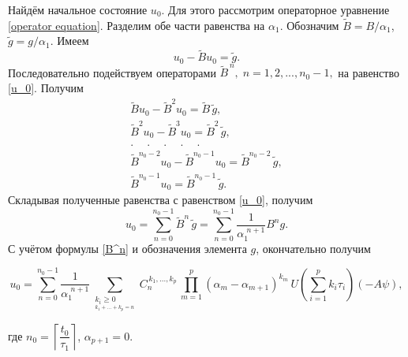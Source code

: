 \documentclass{article}
\renewcommand{\ge}{\geqslant}
\theoremstyle{definition}
\begin{document}
Найдём начальное состояние $u_0$. Для этого рассмотрим операторное уравнение \eqref{operator equation}.
Разделим обе части равенства на $\alpha_1$. 
Обозначим $\widetilde{B} = B/\alpha_1$, \linebreak  $\widetilde{g} = g/\alpha_1$. Имеем
\begin{equation} \label{u_0}
	u_0 - \widetilde{B}u_0 = \widetilde{g}.
\end{equation}
Последовательно подействуем операторами $ \widetilde{B}^{\,n}, \; n = 1, 2, ..., n_0 - 1 ,$ на равенство \eqref{u_0}. Получим
\begin{gather*} 
	\widetilde{B}u_0 - \widetilde{B}^2u_0 = \widetilde{B}\,\widetilde{g}, \\
	\widetilde{B}^2u_0 - \widetilde{B}^3u_0 = \widetilde{B}^2\,\widetilde{g}, \\
	.\phantom{-}.\phantom{-}.\phantom{-}.\phantom{-}. \\
	\widetilde{B}^{n_0 - 2}u_0 - \widetilde{B}^{n_0 - 1}u_0 = \widetilde{B}^{n_0 - 2}\,\widetilde{g}, \\
	\widetilde{B}^{n_0 - 1}u_0  = \widetilde{B}^{n_0 - 1}\,\widetilde{g}.
\end{gather*}
Складывая полученные равенства с равенством \eqref{u_0}, получим
\begin{equation} \label{solution}
	u_0 = \sum\limits_{n = 0}^{n_0 - 1} \widetilde{B}^{n}\,\widetilde{g} = 
	\sum\limits_{n = 0}^{n_0 - 1} \frac{1}{\alpha_1^{\,\,n + 1}}B^{n} g.
\end{equation}
С учётом формулы \eqref{B^n} и обозначения элемента $g$, окончательно получим
\begin{onehalfspacing}
	\begin{equation} \label{abstract solution}
		u_0 = \sum\limits_{n = 0}^{n_0 - 1} \frac{1}{\alpha_1^{\,\,n + 1}}\sum\limits_{\substack{{k_i \ge 0} \\_{k_1 + ... + k_p = n}}}\!\!\!\!C_n^{\,k_1, ..., k_p}\,
		\prod_{m = 1}^{p}(\alpha_m - \alpha_{m + 1})^{k_m}\,U\!\left( \sum\limits_{i = 1}^{p}k_i\tau_i \right)(-A\psi),
	\end{equation}
\end{onehalfspacing}
где $n_0 = \left\lceil \dfrac{t_0}{\tau_1} \right\rceil$, $ \alpha_{p + 1} = 0 $.
\end{document}
